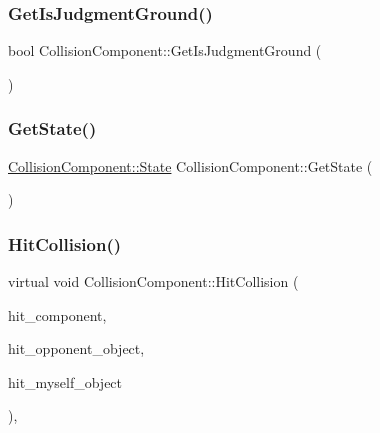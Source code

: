 \mbox{\label{class_collision_component_adb0dcdb246d9e8efd03d4c433a673bb9}} 
\subsubsection{\texorpdfstring{Get\+Is\+Judgment\+Ground()}{GetIsJudgmentGround()}}
{\footnotesize\ttfamily bool Collision\+Component\+::\+Get\+Is\+Judgment\+Ground (\begin{DoxyParamCaption}{ }\end{DoxyParamCaption})\hspace{0.3cm}{\ttfamily [inline]}}

\mbox{\label{class_collision_component_a9d614f27219068bb9d17574e0f8a8767}} 
\subsubsection{\texorpdfstring{Get\+State()}{GetState()}}
{\footnotesize\ttfamily \mbox{\hyperlink{class_collision_component_a91ba750c14ccd0f4857f0302f06084c6}{Collision\+Component\+::\+State}} Collision\+Component\+::\+Get\+State (\begin{DoxyParamCaption}{ }\end{DoxyParamCaption})\hspace{0.3cm}{\ttfamily [inline]}}

\mbox{\label{class_collision_component_a50c4fea9d37eb22ac435ee5c2ce36254}} 
\subsubsection{\texorpdfstring{Hit\+Collision()}{HitCollision()}}
{\footnotesize\ttfamily virtual void Collision\+Component\+::\+Hit\+Collision (\begin{DoxyParamCaption}\item[{\mbox{\hyperlink{class_collision_component}{Collision\+Component}} $\ast$}]{hit\+\_\+component,  }\item[{\mbox{\hyperlink{class_collision_object}{Collision\+Object}} $\ast$}]{hit\+\_\+opponent\+\_\+object,  }\item[{\mbox{\hyperlink{class_collision_object}{Collision\+Object}} $\ast$}]{hit\+\_\+myself\+\_\+object }\end{DoxyParamCaption})\hspace{0.3cm}{\ttfamily [inline]}, {\ttfamily [virtual]}}



